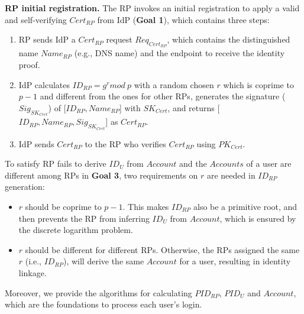 \vspace{1mm}\noindent\textbf{RP initial registration.}
The RP invokes an initial registration to apply a valid and self-verifying $Cert_{RP}$ from IdP (\textbf{Goal 1}),
 which contains three steps:

\begin{enumerate}
\item RP sends IdP a $Cert_{RP}$ request $Req_{Cert_{RP}}$, which contains the distinguished name $Name_{RP}$ (e.g., DNS name) and the endpoint to receive the identity proof.
\item IdP calculates $ID_{RP} = g^r mod \ p$ with a random chosen $r$ which is coprime to $p-1$ and different from the ones for other RPs,  generates the signature ($Sig_{SK_{Cert}}$) of [$ID_{RP}, Name_{RP}$] with $SK_{Cert}$, and returns [$ID_{RP}, Name_{RP}, Sig_{SK_{Cert}}$] as $Cert_{RP}$.
\item IdP sends $Cert_{RP}$ to the RP who verifies $Cert_{RP}$ using $PK_{Cert}$.
\end{enumerate}



To satisfy RP fails to derive $ID_U$ from $Account$ and the $Accounts$ of a user are different among RPs in \textbf{Goal 3}, two requirements on $r$ are needed  in $ID_{RP}$ generation:
\begin{itemize}
  \item $r$ should be coprime to $p-1$. This makes $ID_{RP}$ also be  a primitive root, and then prevents the RP from inferring $ID_U$ from $Account$, which is  ensured by the discrete logarithm problem.

  \item  $r$ should be different for different RPs. Otherwise, the RPs assigned the same $r$ (i.e., $ID_{RP}$), will derive the same $Account$ for a user, resulting in identity linkage. %
\end{itemize}





Moreover, we provide the algorithms for  calculating  $PID_{RP}$, $PID_U$ and $Account$,
which are the foundations to process each user's login. %


